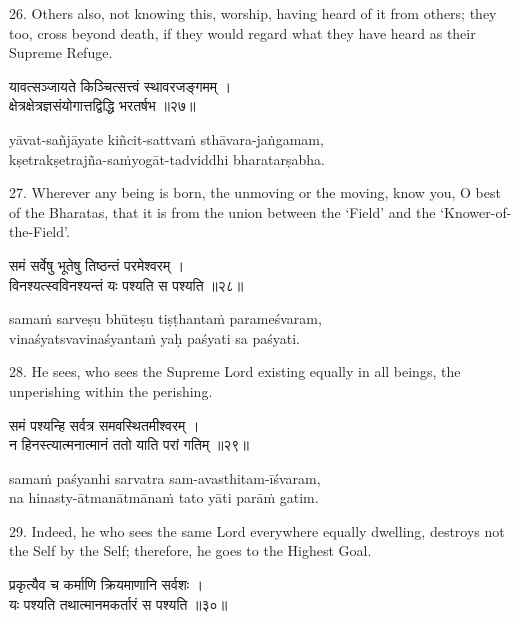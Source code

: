 26. Others also, not knowing this, worship, having heard of it from others;
they too, cross beyond death, if they would regard what they have heard as
their Supreme Refuge.

\begin{gitaverse}
यावत्सञ्जायते किञ्चित्सत्त्वं स्थावरजङ्गमम् । \\
क्षेत्रक्षेत्रज्ञसंयोगात्तद्विद्धि भरतर्षभ ॥२७॥
\end{gitaverse}

\begin{transliteration}
yāvat-sañjāyate kiñcit-sattvaṁ sthāvara-jaṅgamam, \\
kṣetrakṣetrajña-saṁyogāt-tadviddhi bharatarṣabha.
\end{transliteration}

27. Wherever any being is born, the unmoving or the moving, know you, O best of
the Bharatas, that it is from the union between the `Field' and the
`Knower-of-the-Field'.

\begin{gitaverse}
समं सर्वेषु भूतेषु तिष्ठन्तं परमेश्वरम् । \\
विनश्यत्स्वविनश्यन्तं यः पश्यति स पश्यति ॥२८॥
\end{gitaverse}

\begin{transliteration}
samaṁ sarveṣu bhūteṣu tiṣṭhantaṁ parameśvaram, \\
vinaśyatsvavinaśyantaṁ yaḥ paśyati sa paśyati.
\end{transliteration}

28. He sees, who sees the Supreme Lord existing equally in all beings, the
unperishing within the perishing.

\begin{gitaverse}
समं पश्यन्हि सर्वत्र समवस्थितमीश्वरम् । \\
न हिनस्त्यात्मनात्मानं ततो याति परां गतिम् ॥२९॥
\end{gitaverse}

\begin{transliteration}
samaṁ paśyanhi sarvatra sam-avasthitam-īśvaram, \\
na hinasty-ātmanātmānaṁ tato yāti parāṁ gatim.
\end{transliteration}

29. Indeed, he who sees the same Lord everywhere equally dwelling, destroys not
the Self by the Self; therefore, he goes to the Highest Goal.

\begin{gitaverse}
प्रकृत्यैव च कर्माणि क्रियमाणानि सर्वशः । \\
यः पश्यति तथात्मानमकर्तारं स पश्यति ॥३०॥
\end{gitaverse}

